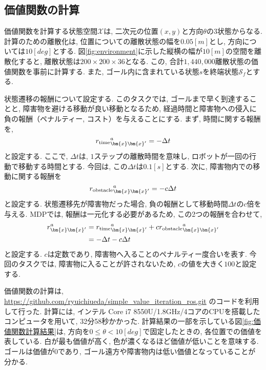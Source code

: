\subsection{価値関数の計算}
価値関数を計算する状態空間$\mathcal{X}$は, 二次元の位置$(x, y)$と方向$\theta$の3状態からなる. 
計算のための離散化は, 位置についての離散状態の幅を$0.05\si{[m]}$とし, 方向については$10\si{[deg]}$とする. 
図\ref{fig:environment}に示した縦横の幅が$10\si{[m]}$の空間を離散化すると, 離散状態は$200 \times 200 \times 36$となる. 
この, 合計$1,440,000$離散状態の価値関数を事前に計算する. 
また, ゴール内に含まれている状態$s$を終端状態$\mathcal{S}_f$とする. 

状態遷移の報酬について設定する. 
このタスクでは, ゴールまで早く到達することと, 障害物を避ける移動が良い移動となるため, 
経過時間と障害物への侵入に負の報酬（ペナルティー, コスト）を与えることにする. 
まず, 時間に関する報酬を, 
\begin{equation}
\label{robot initial pose}
  {r_{\rm time}}^{a}_{\bm{x}\bm{x}^{\prime}} = -\Delta t
\end{equation}
と設定する. ここで, $\Delta t$は, $1$ステップの離散時間を意味し, ロボットが一回の行動で移動する時間とする. 
今回は, この$\Delta t$は$0.1[s]$とする. 
次に, 障害物内での移動に関する報酬を
\begin{equation}
\label{robot initial pose}
  {r_{\rm obstacle}}^{a}_{\bm{x}\bm{x}^{\prime}} = -c\Delta t
\end{equation}
と設定する. 状態遷移先が障害物だった場合, 負の報酬として移動時間$\Delta t$の$c$倍を与える. 
MDPでは, 報酬は一元化する必要があるため, この2つの報酬を合わせて, 
\begin{equation}
\label{robot initial pose}
\begin{split}
  r^{a}_{\bm{x}\bm{x}^{\prime}} &=
  {r_{\rm time}}^{a}_{\bm{x}\bm{x}^{\prime}} +
  c{r_{\rm obstacle}}^{a}_{\bm{x}\bm{x}^{\prime}} \\
  &= -\Delta t  -c\Delta t
\end{split}
\end{equation}
と設定する. 
$c$は定数であり, 障害物へ入ることのペナルティー度合いを表す. 
今回のタスクでは, 障害物に入ることが許されないため, $c$の値を大きく$100$と設定する. 

価値関数の計算は, 
\url{https://github.com/ryuichiueda/simple_value_iteration_ros.git}
のコードを利用して行った. 
計算には, インテル Core i7 8550U/1.8GHz/4コアのCPUを搭載したコンピュータを用いて, 32分58秒かかった. 
計算結果の一部を示している図\ref{fig:価値関数計算結果}は, 
方向を$0 \leq \theta < 10 \si{[deg]}$で固定したときの, 各位置での価値を表している. 
白が最も価値が高く, 色が濃くなるほど価値が低いことを意味する. 
ゴールは価値が$0$であり, ゴール遠方や障害物内は低い価値となっていることが分かる. 

